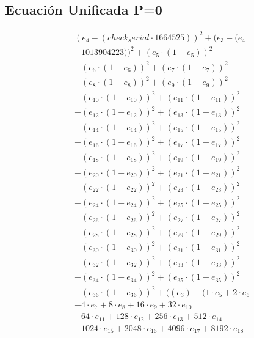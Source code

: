 \documentclass[10pt, a4paper]{article}
\begin{document}
\subsection*{Ecuación Unificada P=0}
\begin{align*}
& (e_{4} - (check_serial  \cdot  1664525))^{2} + (e_{3} - (e_{4} \\
& + 1013904223))^{2} + (e_{5} \cdot (1 - e_{5}))^{2} \\
& + (e_{6} \cdot (1 - e_{6}))^{2} + (e_{7} \cdot (1 - e_{7}))^{2} \\
& + (e_{8} \cdot (1 - e_{8}))^{2} + (e_{9} \cdot (1 - e_{9}))^{2} \\
& + (e_{10} \cdot (1 - e_{10}))^{2} + (e_{11} \cdot (1 - e_{11}))^{2} \\
& + (e_{12} \cdot (1 - e_{12}))^{2} + (e_{13} \cdot (1 - e_{13}))^{2} \\
& + (e_{14} \cdot (1 - e_{14}))^{2} + (e_{15} \cdot (1 - e_{15}))^{2} \\
& + (e_{16} \cdot (1 - e_{16}))^{2} + (e_{17} \cdot (1 - e_{17}))^{2} \\
& + (e_{18} \cdot (1 - e_{18}))^{2} + (e_{19} \cdot (1 - e_{19}))^{2} \\
& + (e_{20} \cdot (1 - e_{20}))^{2} + (e_{21} \cdot (1 - e_{21}))^{2} \\
& + (e_{22} \cdot (1 - e_{22}))^{2} + (e_{23} \cdot (1 - e_{23}))^{2} \\
& + (e_{24} \cdot (1 - e_{24}))^{2} + (e_{25} \cdot (1 - e_{25}))^{2} \\
& + (e_{26} \cdot (1 - e_{26}))^{2} + (e_{27} \cdot (1 - e_{27}))^{2} \\
& + (e_{28} \cdot (1 - e_{28}))^{2} + (e_{29} \cdot (1 - e_{29}))^{2} \\
& + (e_{30} \cdot (1 - e_{30}))^{2} + (e_{31} \cdot (1 - e_{31}))^{2} \\
& + (e_{32} \cdot (1 - e_{32}))^{2} + (e_{33} \cdot (1 - e_{33}))^{2} \\
& + (e_{34} \cdot (1 - e_{34}))^{2} + (e_{35} \cdot (1 - e_{35}))^{2} \\
& + (e_{36} \cdot (1 - e_{36}))^{2} + ((e_{3}) - (1 \cdot e_{5} + 2 \cdot e_{6} \\
& + 4 \cdot e_{7} + 8 \cdot e_{8} + 16 \cdot e_{9} + 32 \cdot e_{10} \\
& + 64 \cdot e_{11} + 128 \cdot e_{12} + 256 \cdot e_{13} + 512 \cdot e_{14} \\
& + 1024 \cdot e_{15} + 2048 \cdot e_{16} + 4096 \cdot e_{17} + 8192 \cdot e_{18} \\

\end{align*}
\end{document}

